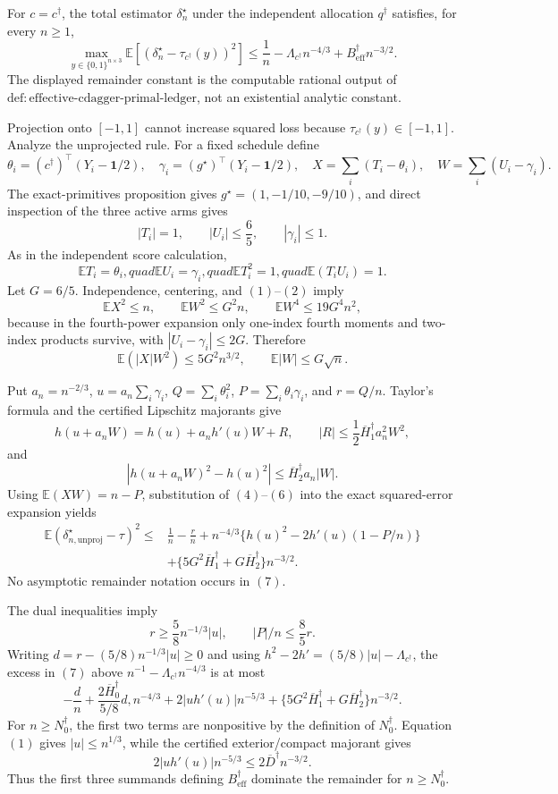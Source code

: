 For \(c=c^\dagger\), the total estimator \(\delta_n^\star\) under the independent allocation \(q^\dagger\) satisfies, for every \(n\ge1\),
\[
\max_{y\in\{0,1\}^{n\times3}}
\mathbb E\left[(\delta_n^\star-\tau_{c^\dagger}(y))^2\right]
\le\frac1n-\Lambda_{c^\dagger}n^{-4/3}
+B_{\mathrm{eff}}^\dagger n^{-3/2}.
\]
The displayed remainder constant is the computable rational output of
\(\mathrm{def:effective\text{-}cdagger\text{-}primal\text{-}ledger}\), not an existential analytic constant.

Projection onto \([-1,1]\) cannot increase squared loss because
\(\tau_{c^\dagger}(y)\in[-1,1]\).  Analyze the unprojected rule.  For a fixed schedule define
\[
\theta_i=(c^\dagger)^\top(Y_i-\mathbf1/2),
\quad \gamma_i=(g^\star)^\top(Y_i-\mathbf1/2),
\quad X=\sum_i(T_i-\theta_i),
\quad W=\sum_i(U_i-\gamma_i).
\]
The exact-primitives proposition gives \(g^\star=(1,-1/10,-9/10)\), and direct inspection of the three active arms gives
\[
|T_i|=1,\qquad |U_i|\le\frac65,\qquad |\gamma_i|\le1.
\tag{1}
\]
As in the independent score calculation,
\[
\mathbb ET_i=\theta_i,quad \mathbb EU_i=\gamma_i,quad
\mathbb ET_i^2=1,quad \mathbb E(T_iU_i)=1.
\tag{2}
\]
Let \(G=6/5\).  Independence, centering, and \((1)\)--\((2)\) imply
\[
\mathbb EX^2\le n,\qquad \mathbb EW^2\le G^2n,\qquad
\mathbb EW^4\le19G^4n^2,
\tag{3}
\]
because in the fourth-power expansion only one-index fourth moments and two-index products survive, with
\(|U_i-\gamma_i|\le2G\).  Therefore
\[
\mathbb E(|X|W^2)\le5G^2n^{3/2},\qquad
\mathbb E|W|\le G\sqrt n.
\tag{4}
\]

Put \(a_n=n^{-2/3}\),
\(u=a_n\sum_i\gamma_i\), \(Q=\sum_i\theta_i^2\),
\(P=\sum_i\theta_i\gamma_i\), and \(r=Q/n\).
Taylor's formula and the certified Lipschitz majorants give
\[
h(u+a_nW)=h(u)+a_nh'(u)W+R,
\qquad |R|\le\frac12\overline H_1^\dagger a_n^2W^2,
\tag{5}
\]
and
\[
|h(u+a_nW)^2-h(u)^2|
\le\overline H_2^\dagger a_n|W|.
\tag{6}
\]
Using \(\mathbb E(XW)=n-P\), substitution of \((4)\)--\((6)\) into the exact squared-error expansion yields
\[
\begin{aligned}
\mathbb E(\delta_{n,\mathrm{unproj}}^\star-\tau)^2
\le{}&\frac1n-\frac rn
+n^{-4/3}\{h(u)^2-2h'(u)(1-P/n)\}\\
&+\{5G^2\overline H_1^\dagger
+G\overline H_2^\dagger\}n^{-3/2}.
\end{aligned}
\tag{7}
\]
No asymptotic remainder notation occurs in \((7)\).

The dual inequalities imply
\[
r\ge\frac58n^{-1/3}|u|,
\qquad |P|/n\le\frac85r.
\tag{8}
\]
Writing \(d=r-(5/8)n^{-1/3}|u|\ge0\) and using
\(h^2-2h'=(5/8)|u|-\Lambda_{c^\dagger}\), the excess in \((7)\) above
\(n^{-1}-\Lambda_{c^\dagger}n^{-4/3}\) is at most
\[
-\frac dn+\frac{2\overline H_0^\dagger}{5/8}d,n^{-4/3}
+2|uh'(u)|n^{-5/3}
+\{5G^2\overline H_1^\dagger+G\overline H_2^\dagger\}n^{-3/2}.
\tag{9}
\]
For \(n\ge N_0^\dagger\), the first two terms are nonpositive by the definition of \(N_0^\dagger\).  Equation \((1)\) gives \(|u|\le n^{1/3}\), while the certified exterior/compact majorant gives
\[
2|uh'(u)|n^{-5/3}\le2\overline D^\dagger n^{-3/2}.
\tag{10}
\]
Thus the first three summands defining \(B_{\mathrm{eff}}^\dagger\) dominate the remainder for \(n\ge N_0^\dagger\).

